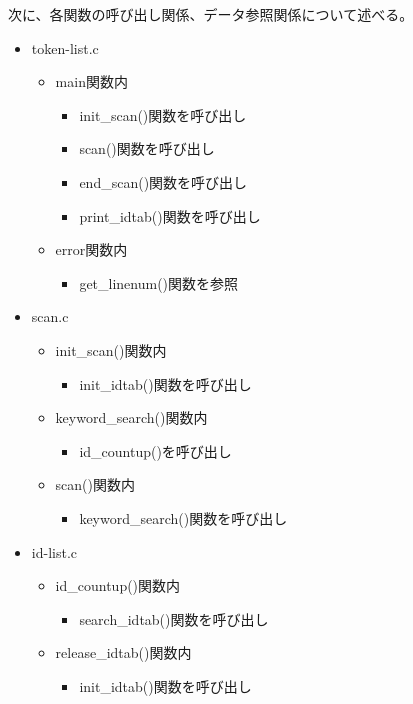 \documentclass{jarticle}
\begin{document}
次に、各関数の呼び出し関係、データ参照関係について述べる。
\begin{itemize}
  \item token-list.c
  \begin{itemize}
    \item main関数内
    \begin{itemize}
      \item init\_scan()関数を呼び出し
      \item scan()関数を呼び出し
      \item end\_scan()関数を呼び出し
      \item print\_idtab()関数を呼び出し
    \end{itemize}
    \item error関数内
    \begin{itemize}
      \item get\_linenum()関数を参照
    \end{itemize}
  \end{itemize}
  \item scan.c
  \begin{itemize}
    \item init\_scan()関数内
    \begin{itemize}
      \item init\_idtab()関数を呼び出し
    \end{itemize}
    \item keyword\_search()関数内
    \begin{itemize}
      \item id\_countup()を呼び出し
    \end{itemize}
    \item scan()関数内
    \begin{itemize}
      \item keyword\_search()関数を呼び出し
    \end{itemize}
  \end{itemize}
  \item id-list.c
  \begin{itemize}
    \item id\_countup()関数内
    \begin{itemize}
      \item search\_idtab()関数を呼び出し
    \end{itemize}
    \item release\_idtab()関数内
    \begin{itemize}
      \item init\_idtab()関数を呼び出し
    \end{itemize}
  \end{itemize}
\end{itemize}
\end{document}
